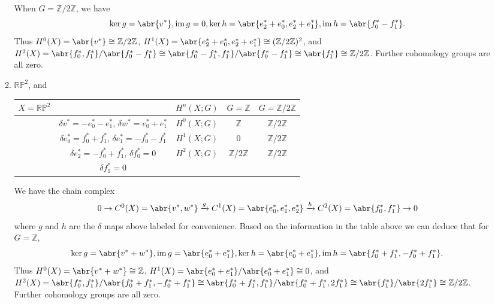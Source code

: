 \documentclass[11pt]{article}
\DeclareMathOperator{\im}{im}
\begin{document}
\begin{enumerate}
\begin{enumerate}
        When $G = \mathbb{Z}/2\mathbb{Z}$, we have \[\ker g = \abr{v^\ast}, \im g = 0, \ker h = \abr{e_2^\ast+e_0^\ast,e_2^\ast+e_1^\ast}, \im h = \abr{f_0^\ast-f_1^\ast}.\] Thus $H^0(X) = \abr{v^\ast}\cong \mathbb{Z}/2\mathbb{Z}$, $H^1(X) = \abr{e_2^\ast+e_0^\ast,e_2^\ast+e_1^\ast} \cong (\mathbb{Z}/2\mathbb{Z})^2$, and $H^2(X) = \abr{f_0^\ast, f_1^\ast}/\abr{f_0^\ast-f_1^\ast} \cong \abr{f_0^\ast-f_1^\ast, f_1^\ast}/\abr{f_0^\ast-f_1^\ast}\cong \abr{f_1^\ast}\cong \mathbb{Z}/2\mathbb{Z}$. Further cohomology groups are all zero.
      \item $\mathbb{RP}^2$, and
      \begin{table}[h]
        \centering
        \begin{tabular}{cc|c|c|c}
          $X = \mathbb{RP}^2$\hspace*{3cm} & \hspace*{5cm} & $H^n(X;G)$ & $G = \mathbb{Z}$ & $G = \mathbb{Z}/2\mathbb{Z}$  \\ \hline
         & $\delta v^\ast= -e_0^\ast-e_1^\ast$, $\delta w^\ast= e_0^\ast + e_1^\ast$ & $H^0(X;G)$ & $\mathbb{Z}$ & $\mathbb{Z}/2\mathbb{Z}$  \\
         & $\delta e_0^\ast= f_0^\ast+f_1^\ast$, $\delta e_1^\ast= -f_0^\ast-f_1^\ast$ & $H^1(X;G)$ & $0$ & $\mathbb{Z}/2\mathbb{Z}$  \\
         & $\delta e_2^\ast= -f_0^\ast+f_1^\ast$, $\delta f_0^\ast= 0$ & $H^2(X;G)$ & $\mathbb{Z}/2\mathbb{Z}$ & $\mathbb{Z}/2\mathbb{Z}$  \\
         & $\delta f_1^\ast= 0$ &  &  &  
        \end{tabular}
        \end{table}

        We have the chain complex \[0\to C^0(X) = \abr{v^\ast,w^\ast}\xrightarrow{g}C^1(X) = \abr{e_0^\ast, e_1^\ast, e_2^\ast}\xrightarrow{h}C^2(X) =\abr{f_0^\ast, f_1^\ast}\to 0\] where $g$ and $h$ are the $\delta$ maps above labeled for convenience. Based on the information in the table above we can deduce that for $G =\mathbb{Z}$, \[\ker g = \abr{v^\ast + w^\ast}, \im g = \abr{e_0^\ast + e_1^\ast}, \ker h = \abr{e_0^\ast+e_1^\ast}, \im h = \abr{f_0^\ast+f_1^\ast,-f_0^\ast+f_1^\ast}.\] Thus $H^0(X) = \abr{v^\ast + w^\ast}\cong \mathbb{Z}$, $H^1(X) = \abr{e_0^\ast + e_1^\ast}/\abr{e_0^\ast + e_1^\ast} \cong 0$, and $H^2(X) = \abr{f_0^\ast, f_1^\ast}/\abr{f_0^\ast+f_1^\ast,-f_0^\ast+f_1^\ast} \cong \abr{f_0^\ast+f_1^\ast, f_1^\ast}/\abr{f_0^\ast+f_1^\ast,2f_1^\ast}\cong \abr{f_1^\ast}/\abr{2f_1^\ast}\cong \mathbb{Z}/2\mathbb{Z}$. Further cohomology groups are all zero.
        

\end{enumerate}
\end{enumerate}
\end{document}
